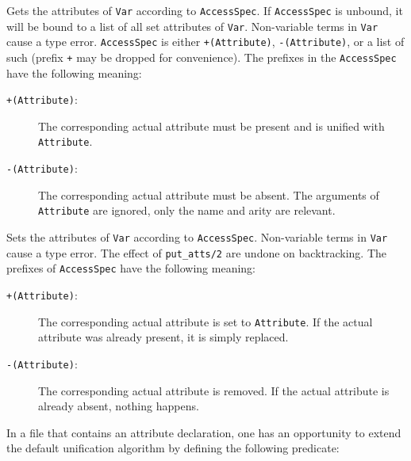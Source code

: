 \begin{description}
    Gets the attributes of \texttt{Var} according to
    \texttt{AccessSpec}. If \texttt{AccessSpec} is unbound, it will be
    bound to a list of all set attributes of \texttt{Var}.  Non-variable
    terms in \texttt{Var} cause a type error.  \texttt{AccessSpec} is
    either \texttt{+(Attribute)}, \texttt{-(Attribute)}, or a list of
    such (prefix \texttt{+} may be dropped for convenience).  The
    prefixes in the \texttt{AccessSpec} have the following meaning:

    \begin{description}
    \item[\texttt{+(Attribute)}:]
      The corresponding actual attribute must be present and is unified
      with \texttt{Attribute}.

    \item[\texttt{-(Attribute)}:]
      The corresponding actual attribute must be absent.  The arguments
      of \texttt{Attribute} are ignored, only the name and arity are
      relevant.
    \end{description}

    Sets the attributes of \texttt{Var} according to
    \texttt{AccessSpec}.  Non-variable terms in \texttt{Var} cause a
    type error.  The effect of \texttt{put\_atts/2} are undone on
    backtracking.  The prefixes of \texttt{AccessSpec} have the
    following meaning:

    \begin{description}
    \item[\texttt{+(Attribute)}:]
      The corresponding actual attribute is set to \texttt{Attribute}.
      If the actual attribute was already present, it is simply
      replaced.

    \item[\texttt{-(Attribute)}:]
      The corresponding actual attribute is removed.  If the actual
      attribute is already absent, nothing happens.

    \end{description}

\end{description}

In a file that contains an attribute declaration, one has an opportunity
to extend the default unification algorithm by defining the following
predicate:


